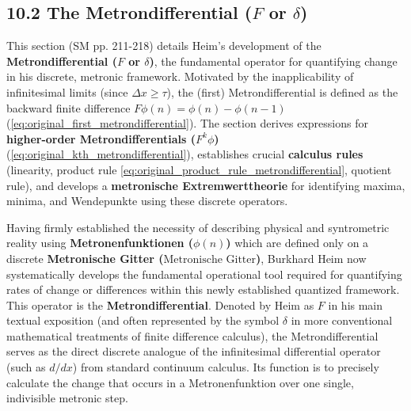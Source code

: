 \documentclass[12pt]{article}
\newcommand{\metron}{\tau}
\newcommand{\metronischegitter}{\text{Metronische Gitter}}
\newcommand{\metrondifferential}{F} %
\newcommand{\metronenfunktion}{\phi(n)}
\begin{document}
\subsection{10.2 The Metrondifferential (\texorpdfstring{\( \metrondifferential \)}{F} or \texorpdfstring{\( \delta \)}{delta})}
\label{sec:metrondifferential}

This section (SM pp. 211-218) details Heim's development of the \textbf{Metrondifferential (\(\metrondifferential\) or \( \delta \))}, the fundamental operator for quantifying change in his discrete, metronic framework. Motivated by the inapplicability of infinitesimal limits (since \( \Delta x \geq \metron \)), the (first) Metrondifferential is defined as the backward finite difference \( F\phi(n) = \phi(n) - \phi(n-1) \) (\eqref{eq:original_first_metrondifferential}). The section derives expressions for \textbf{higher-order Metrondifferentials (\(F^k\phi\))} (\eqref{eq:original_kth_metrondifferential}), establishes crucial \textbf{calculus rules} (linearity, product rule \eqref{eq:original_product_rule_metrondifferential}, quotient rule), and develops a \textbf{metronische Extremwerttheorie} for identifying maxima, minima, and Wendepunkte using these discrete operators.

Having firmly established the necessity of describing physical and syntrometric reality using \textbf{Metronenfunktionen (\( \metronenfunktion \))} which are defined only on a discrete \textbf{Metronische Gitter (\(\metronischegitter\))}, Burkhard Heim now systematically develops the fundamental operational tool required for quantifying rates of change or differences within this newly established quantized framework. This operator is the \textbf{Metrondifferential}. Denoted by Heim as \( \metrondifferential \) in his main textual exposition (and often represented by the symbol \( \delta \) in more conventional mathematical treatments of finite difference calculus), the Metrondifferential serves as the direct discrete analogue of the infinitesimal differential operator (such as \( d/dx \)) from standard continuum calculus. Its function is to precisely calculate the change that occurs in a Metronenfunktion over one single, indivisible metronic step.
\end{document}
